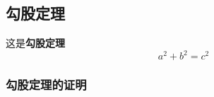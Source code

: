 
\subsection{勾股定理}
这是\textbf{勾股定理}
\begin{equation}
a^2 + b^2 = c^2
\end{equation}

\subsubsection{勾股定理的证明}
